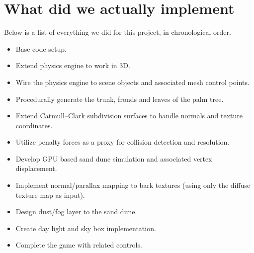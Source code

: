 \documentclass[annual]{acmsiggraph}
\begin{document}
\section{What did we actually implement}
Below is a list of everything we did for this project, in chronological order.
\begin{itemize}
\item{Base code setup.}
\item{Extend physics engine to work in 3D.}
\item{Wire the physics engine to scene objects and associated mesh control points.} 
\item{Procedurally generate the trunk, fronds and leaves of the palm tree.}
\item{Extend Catmull--Clark subdivision surfaces to handle normals and texture coordinates.}
\item{Utilize penalty forces as a proxy for  collision detection and resolution.}
\item{Develop GPU based sand dune simulation and associated vertex displacement.}
\item{Implement normal/parallax mapping to bark textures (using only the diffuse texture map as input).}
\item{Design dust/fog  layer to the sand dune.}
\item{Create day light and sky box implementation.}
\item{Complete the game with related controls.}
\end{itemize}
\end{document}
